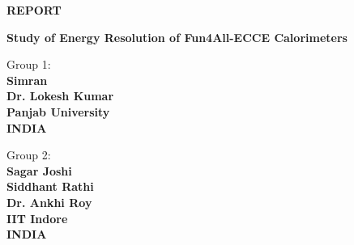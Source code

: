 \begin{titlepage}

\thispagestyle{empty}
    \begin{center}
        \vspace*{1cm}
            
        \LARGE
        \textbf{REPORT}\\
                \vspace{1cm}

        \textbf{Study of Energy Resolution of Fun4All-ECCE Calorimeters}
            
        
            
        \vspace{3cm}
        
        \begin{doublespace}
            \begin{minipage}[t]{0.47\textwidth}
	            {\large{Group 1:}{\normalsize\vspace{3mm}
        	    \bf\\ \large{Simran} \normalsize\vspace{2mm}\bf \\ \large{Dr. Lokesh Kumar}\\
        	    Panjab University\\
        	    INDIA}}
            \end{minipage}
            \hfill
            \begin{minipage}[t]{0.47\textwidth}\raggedleft
	           {\large{Group 2:}{\normalsize\vspace{3mm} \bf\\ \large{Sagar Joshi}\\
	           \large{Siddhant Rathi}\normalsize\vspace{2mm}\bf \\
	           \large{Dr. Ankhi Roy}\\
        	    IIT Indore\\
        	    INDIA}}
            \end{minipage}
\begin{comment}
            
            {\large
            \textbf{GROUP 1}\\
            \textbf{Simran}\\
            \textbf{Dr. Lokesh Kumar}\\
            \textbf{Panjab University}\\
            \textbf{INDIA\\}}
        

\end{comment}
\end{doublespace}
\end{center}
\end{titlepage}
